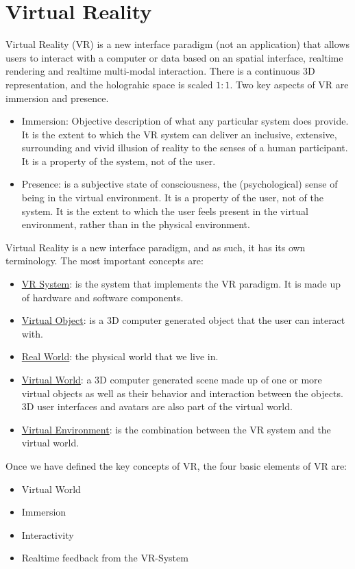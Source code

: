 \chapter{Virtual Reality}

Virtual Reality (VR) is a new interface paradigm (not an application) that allows users to interact with a computer or data based on an spatial interface, realtime rendering and realtime multi-modal interaction. There is a continuous 3D representation, and the holograhic space is scaled $1:1$. Two key aspects of VR are immersion and presence.
\begin{itemize}
    \item Immersion: Objective description of what any particular system does provide. It is the extent to which the VR system can deliver an inclusive, extensive, surrounding and vivid illusion of reality to the senses of a human participant. It is a property of the system, not of the user.
    \item Presence: is a subjective state of consciousness, the (psychological) sense of being in the virtual environment. It is a property of the user, not of the system. It is the extent to which the user feels present in the virtual environment, rather than in the physical environment.
\end{itemize}

Virtual Reality is a new interface paradigm, and as such, it has its own terminology. The most important concepts are:
\begin{itemize}
    \item \ul{VR System}: is the system that implements the VR paradigm. It is made up of hardware and software components.
    \item \ul{Virtual Object}: is a 3D computer generated object that the user can interact with.
    \item \ul{Real World}: the physical world that we live in.
    \item \ul{Virtual World}: a 3D computer generated scene made up of one or more virtual objects as well as their behavior and interaction between the objects. 3D user interfaces and avatars are also part of the virtual world.
    \item \ul{Virtual Environment}: is the combination between the VR system and the virtual world.
\end{itemize}

Once we have defined the key concepts of VR, the four basic elements of VR are:
\begin{itemize}
    \item Virtual World
    \item Immersion
    \item Interactivity
    \item Realtime feedback from the VR-System
\end{itemize}

